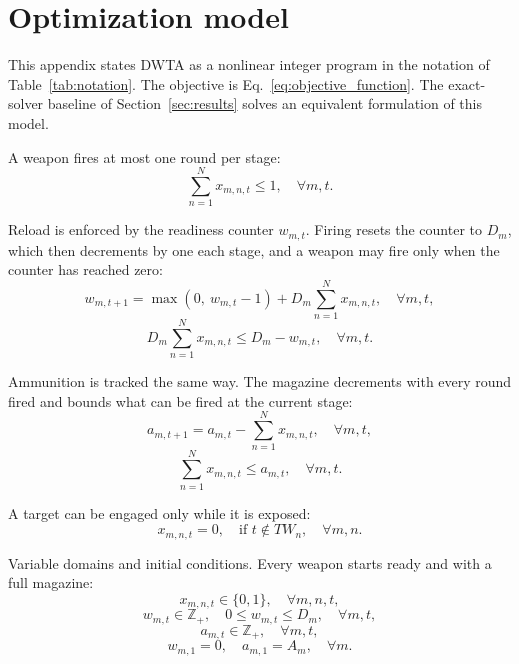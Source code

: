 \section{Optimization model}
\label{app:model}

This appendix states DWTA as a nonlinear integer program in the notation of
Table~\ref{tab:notation}. The objective is Eq.~\eqref{eq:objective_function}.
The exact-solver baseline of Section~\ref{sec:results} solves an equivalent
formulation of this model.

A weapon fires at most one round per stage:
\begin{equation}\label{eq:weapon_target_constraint}
    \sum_{n=1}^{N} x_{m,n,t} \leq 1, \quad \forall m, t.
\end{equation}

Reload is enforced by the readiness counter $w_{m,t}$. Firing resets the
counter to $D_m$, which then decrements by one each stage, and a weapon may
fire only when the counter has reached zero:
\begin{equation}\label{eq:wait_time_update}
    w_{m,t+1} = \max\left(0,\ w_{m,t} - 1\right) + D_{m} \sum_{n=1}^{N} x_{m,n,t}, \quad \forall m, t,
\end{equation}
\begin{equation}\label{eq:weapon_readiness}
    D_{m} \sum_{n=1}^{N} x_{m,n,t} \leq D_{m} - w_{m,t}, \quad \forall m, t.
\end{equation}

Ammunition is tracked the same way. The magazine decrements with every round
fired and bounds what can be fired at the current stage:
\begin{equation}\label{eq:ammunition_usage}
    a_{m,t+1} = a_{m,t} - \sum_{n=1}^{N} x_{m,n,t}, \quad \forall m, t,
\end{equation}
\begin{equation}\label{eq:ammunition_constraint}
    \sum_{n=1}^{N} x_{m,n,t} \leq a_{m,t}, \quad \forall m, t.
\end{equation}

A target can be engaged only while it is exposed:
\begin{equation}\label{eq:target_time_window}
    x_{m,n,t} = 0, \quad \text{if } t \notin TW_n, \quad \forall m, n.
\end{equation}

Variable domains and initial conditions. Every weapon starts ready and with a
full magazine:
\begin{equation}\label{eq:binary_assignment}
    x_{m,n,t} \in \{0,1\}, \quad \forall m, n, t,
\end{equation}
\begin{equation}\label{eq:wait_time_bounds}
    w_{m,t} \in \mathbb{Z}_{+}, \quad 0 \leq w_{m,t} \leq D_{m}, \quad \forall m, t,
\end{equation}
\begin{equation}\label{eq:remaining_ammunition_integer}
    a_{m,t} \in \mathbb{Z}_{+}, \quad \forall m, t,
\end{equation}
\begin{equation}\label{eq:initial_availability}
    w_{m,1} = 0, \quad a_{m,1} = A_m, \quad \forall m.
\end{equation}
